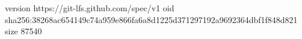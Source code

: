 version https://git-lfs.github.com/spec/v1
oid sha256:38268ac654149c74a959e866fa6a8d1225d371297192a9692364dbf1f848d821
size 87540
